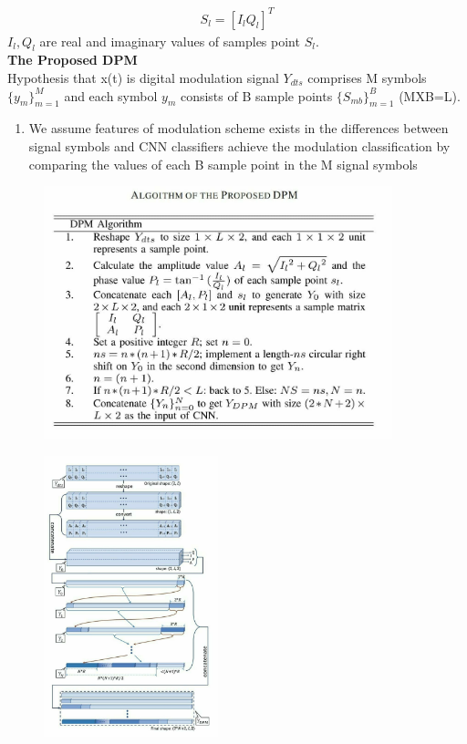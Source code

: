 \documentclass{beamer}
\begin{document}
\begin{frame}
\begin{align}
     S_{l} = [I_{l}Q_{l}]^{T}
 \end{align}
 $I_{l},Q_{l}$ are real and imaginary values of samples point $S_{l}$.\\
 
\textbf{The Proposed DPM}\\

 Hypothesis that x(t) is digital modulation signal $Y_{dts}$ comprises M symbols $\{y_{m}\}_{m=1}^{M}$ and each symbol $y_{m}$ consists of B sample points $\{S_{mb}\}_{m=1}^{B}$ (MXB=L).
\begin{enumerate}[]
    \item We assume features of modulation scheme exists in the differences between signal symbols and CNN classifiers achieve the modulation classification by comparing the values of each B sample point in the M signal symbols
\end{enumerate}
\end{frame}
\begin{frame}
     \begin{figure}[h]
    \centering
    \includegraphics[width=0.9\textwidth]{algo.jpeg}
\end{figure}  
\end{frame}
\begin{frame}
      \begin{figure}[h]
    \centering
    \includegraphics[width=0.45\textwidth]{descr.jpeg}
\end{figure}  
\end{frame}
\end{document}
